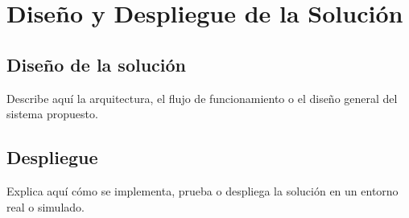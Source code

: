 \chapter{Diseño y Despliegue de la Solución}

\section{Diseño de la solución}

Describe aquí la arquitectura, el flujo de funcionamiento o el diseño general del sistema propuesto.

\section{Despliegue}

Explica aquí cómo se implementa, prueba o despliega la solución en un entorno real o simulado.
